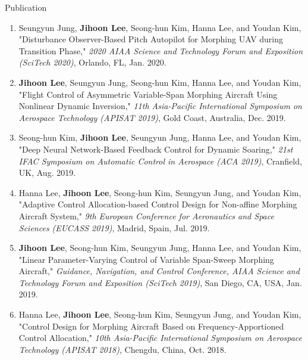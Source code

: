 \documentclass{resume}
\begin{document}
\begin{rSection}{Publication}
\begin{enumerate}
		\item Seungyun Jung, \textbf{\color{coolblack}Jihoon Lee}, Seong-hun Kim, Hanna Lee, and Youdan Kim, "Disturbance Observer-Based Pitch Autopilot for Morphing UAV during Transition Phase," \textit{2020 AIAA Science and Technology Forum and Exposition (SciTech 2020)}, Orlando, FL, Jan. 2020. 
		
		\item \textbf{\color{coolblack}Jihoon Lee}, Seungyun Jung, Seong-hun Kim, Hanna Lee, and Youdan Kim, "Flight Control of Asymmetric Variable-Span Morphing Aircraft Using Nonlinear Dynamic Inversion," \textit{11th Asia-Pacific International Symposium on Aerospace Technology (APISAT 2019)}, Gold Coast, Australia, Dec. 2019. 
		\newline[\href{https://search.informit.com.au/documentSummary;dn=942442757619423;res=IELENG}{Link}] 
	
		\item Seong-hun Kim, \textbf{\color{coolblack}Jihoon Lee}, Seungyun Jung, Hanna Lee, and Youdan Kim, "Deep Neural Network-Based Feedback Control for Dynamic Soaring," \textit{21st IFAC Symposium on Automatic Control in Aerospace (ACA 2019)}, Cranfield, UK, Aug. 2019. 
		
		\item Hanna Lee, \textbf{\color{coolblack}Jihoon Lee}, Seong-hun Kim, Seungyun Jung, and Youdan Kim, "Adaptive Control Allocation-based Control Design for Non-affine Morphing Aircraft System," \textit{9th European Conference for Aeronautics and Space Sciences (EUCASS 2019)}, Madrid, Spain, Jul. 2019. 
		
		\item \textbf{\color{coolblack}Jihoon Lee}, Seong-hun Kim, Seungyun Jung, Hanna Lee, and Youdan Kim, "Linear Parameter-Varying Control of Variable Span-Sweep Morphing Aircraft," \textit{Guidance, Navigation, and Control Conference, AIAA Science and Technology Forum and Exposition (SciTech 2019)}, San Diego, CA, USA, Jan. 2019. 
		
		\item Hanna Lee, \textbf{\color{coolblack}Jihoon Lee}, Seong-hun Kim, Seungyun Jung, and Youdan Kim, "Control Design for Morphing Aircraft Based on Frequency-Apportioned Control Allocation," \textit{10th Asia-Pacific International Symposium on Aerospace Technology (APISAT 2018)}, Chengdu, China, Oct. 2018. 
		

\end{enumerate}
\end{rSection}
\end{document}
